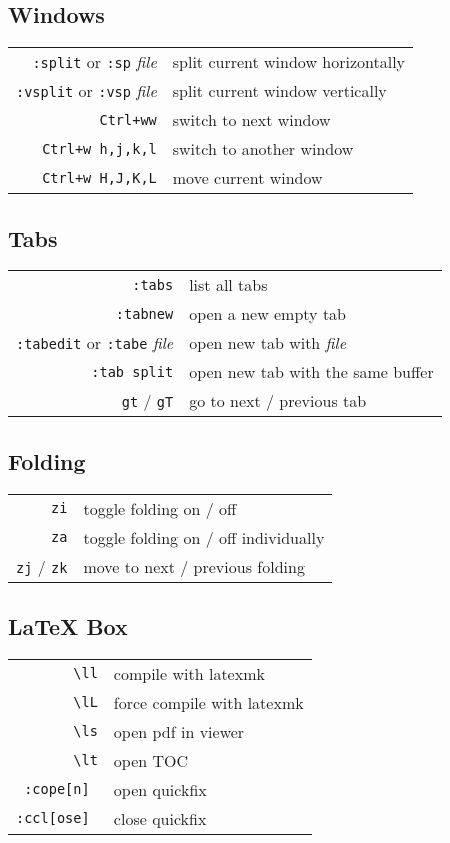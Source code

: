 \begin{multicols*}{3}
\subsection{Windows}
\begin{tabular}{@{}rl@{}}
    \verb|:split| or \verb|:sp| \itshape{file} & split current window horizontally \\
    \verb|:vsplit| or \verb|:vsp| \itshape{file} & split current window vertically \\
    \verb|Ctrl+ww| & switch to next window \\
    \verb|Ctrl+w h,j,k,l| & switch to another window \\
    \verb|Ctrl+w H,J,K,L| & move current window
\end{tabular}

\subsection{Tabs}
\begin{tabular}{@{}rl@{}}
    \verb|:tabs| & list all tabs \\
    \verb|:tabnew| & open a new empty tab \\
    \verb|:tabedit| or \verb|:tabe| \itshape{file} & open new tab with \itshape{file} \\
    \verb|:tab split| & open new tab with the same buffer \\
    \verb|gt| / \verb|gT| & go to next / previous tab
\end{tabular}

\subsection{Folding}
\begin{tabular}{@{}rl@{}}
    \verb|zi| & toggle folding on / off \\
    \verb|za| & toggle folding on / off individually \\
    \verb|zj| / \verb|zk| & move to next / previous folding
\end{tabular}

\subsection{LaTeX Box}
\begin{tabular}{@{}rl@{}}
    \verb|\ll| & compile with latexmk \\
    \verb|\lL| & force compile with latexmk \\
    \verb|\ls| & open pdf in viewer \\
    \verb|\lt| & open TOC \\
    \verb|:cope[n] | & open quickfix \\
    \verb|:ccl[ose] | & close quickfix
\end{tabular}


\end{multicols*}
